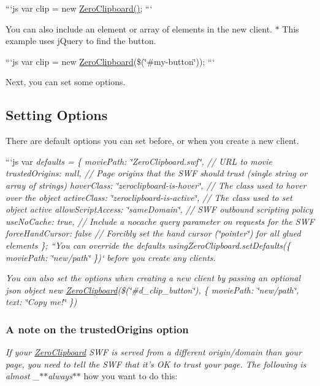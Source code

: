 ```js var clip = new \hyperlink{class_zero_clipboard}{Zero\-Clipboard()}; ```

You can also include an element or array of elements in the new client. $\ast$ This example uses j\-Query to find the button.

```js var clip = new \hyperlink{class_zero_clipboard}{Zero\-Clipboard}(\$(\char`\"{}\#my-\/button\char`\"{})); ```

Next, you can set some options.

\subsection*{Setting Options}

There are default options you can set before, or when you create a new client.

```js var {\itshape defaults = \{ movie\-Path\-: \char`\"{}\-Zero\-Clipboard.\-swf\char`\"{}, // U\-R\-L to movie trusted\-Origins\-: null, // Page origins that the S\-W\-F should trust (single string or array of strings) hover\-Class\-: \char`\"{}zeroclipboard-\/is-\/hover\char`\"{}, // The class used to hover over the object active\-Class\-: \char`\"{}zeroclipboard-\/is-\/active\char`\"{}, // The class used to set object active allow\-Script\-Access\-: \char`\"{}same\-Domain\char`\"{}, // S\-W\-F outbound scripting policy use\-No\-Cache\-: true, // Include a nocache query parameter on requests for the S\-W\-F force\-Hand\-Cursor\-: false // Forcibly set the hand cursor (\char`\"{}pointer\char`\"{}) for all glued elements \}; ``{\ttfamily  You can override the defaults using}Zero\-Clipboard.\-set\-Defaults(\{ movie\-Path\-: \char`\"{}new/path\char`\"{} \})` before you create any clients.}

{\itshape You can also set the options when creating a new client by passing an optional json object {\ttfamily new \hyperlink{class_zero_clipboard}{Zero\-Clipboard}(\$(\char`\"{}\#d\-\_\-clip\-\_\-button\char`\"{}), \{ movie\-Path\-: \char`\"{}new/path\char`\"{}, text\-: \char`\"{}\-Copy me!\char`\"{} \})}}

{\itshape \subsubsection*{A note on the {\ttfamily trusted\-Origins} option}}

{\itshape }

{\itshape If your \hyperlink{class_zero_clipboard}{Zero\-Clipboard} S\-W\-F is served from a different origin/domain than your page, you need to tell the S\-W\-F that it's O\-K to trust your page. The following is almost \-\_\-$\ast$$\ast$always$\ast$$\ast$} how you want to do this\-:

